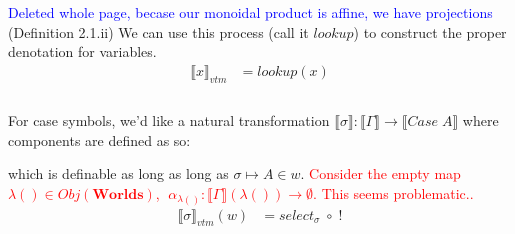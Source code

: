 \documentclass{article}
\newcommand{\den}[1]{\llbracket #1 \rrbracket}
\newcommand{\blue}[1]{\textcolor{blue}{#1}}
\newcommand{\red}[1]{\textcolor{red}{#1}}
\begin{document}
\blue{Deleted whole page, becase our monoidal product is affine, we have projections} \cite{JACOBS199473}(Definition 2.1.ii) We can use this process (call it $lookup$) to construct the proper denotation for variables.
\begin{align*}
    \llbracket  x \rrbracket_{vtm} &= lookup(x) \\
\end{align*}
\\
For case symbols, we'd like a natural transformation $\den{\sigma} : \den{\Gamma} \rightarrow \den{Case \;A}$ where components are defined as so:\\

\begin{figure}[!ht]
    \centering
\end{figure}
which is definable as long as long as $\sigma \mapsto A \in w$. \red{Consider the empty map $\lambda() \in Obj(\mathbf{Worlds})$,  $\;\alpha_{\lambda()} : \den{\Gamma}(\lambda()) \rightarrow \emptyset$. This seems problematic..}
\begin{align*}
    \llbracket  \sigma \rrbracket_{vtm}(w) &= select_{\sigma} \;\circ\; !\\
\end{align*}
\end{document}
